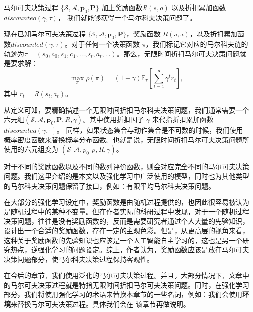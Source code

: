 马尔可夫决策过程 $\{\mathcal{S}, \mathcal{A}, \mathbf{p}_0, \mathbf{P}\}$ 加上奖励函数$R(s, a)$ 以及折扣累加函数$discounted(\gamma, \tau)$， 我们就能够获得一个马尔科夫决策问题了。
\begin{definition}[无限时间折扣马尔科夫决策问题]
    现在已知马尔可夫决策过程 $\{\mathcal{S}, \mathcal{A}, \mathbf{p}_0, \mathbf{P}\}$，奖励函数 $R(s, a)$，以及折扣累加函数$discounted(\gamma, \tau)$。对于任何一个决策函数 $\pi$，我们标记它对应的马尔科夫链的轨迹为$\tau = (s_0, a_0, s_1, a_1, \ldots, s_t, a_t, \ldots)$。那么，无限时间折扣马尔可夫决策问题就是要求解：
    \begin{equation}
        \max_{\pi} \rho(\pi) = (1 - \gamma)
        \mathbb{E}_{\tau}\left[\sum^\infty_{t=1} \gamma^t r_t\right],
    \end{equation}
    其中 $r_t = R(s_t, a_t)$。
\end{definition}

从定义可知，要精确描述一个无限时间折扣马尔科夫决策问题，我们通常需要一个六元组$(\mathcal{S}, \mathcal{A}, \mathbf{p}_0, \mathbf{P}, R, \gamma)$。其中使用折扣因子 $\gamma$ 来代指折扣累加函数 $discounted(\gamma, \cdot)$。 同样，如果状态集合与动作集合是不可数的时候，我们使用概率密度函数来替换概率分布函数。也就是说，无限时间折扣马尔可夫决策问题所使用的六元组变为 $(\mathcal{S}, \mathcal{A}, {p}_0, {p}, R, \gamma)$。

\begin{remark}
对于不同的奖励函数以及不同的数列评价函数，则会对应完全不同的马尔可夫决策问题。我们这里介绍的是本文以及强化学习中广泛使用的模型，同时也为其他类型的马尔科夫决策问题保留了接口，例如：有限平均马尔科夫决策问题。
\end{remark}

\begin{remark}
在大部分的强化学习设定中，奖励函数是由随机过程提供的，也因此很容易被认为是随机过程中的某种不变量。但在作者实际的科研过程中发现，对于一个随机过程决策问题，往往是没有奖励函数的，反而是需要研究者通过个人大量的先验知识，设计出一个合适的奖励函数，存在一定的主观色彩。但是，从更高层的视角来看，这种关于奖励函数的先验知识也应该是一个人工智能自主学习的，这也是另一个研究热点，逆强化学习的问题设定。综上，作者认为，奖励函数应该是放在马尔可夫决策问题部分，使马尔科夫决策过程保持客观性。
\end{remark}

在今后的章节，我们使用泛化的马尔可夫决策过程。并且，大部分情况下，文章中的马尔可夫决策过程就是特指无限时间折扣马尔可夫决策问题。同时，在强化学习部分，我们将使用强化学习的术语来替换本章节的一些名词，例如：我们会使用\textbf{环境}来替换马尔可夫决策过程。具体我们会在
该章节再做说明。

